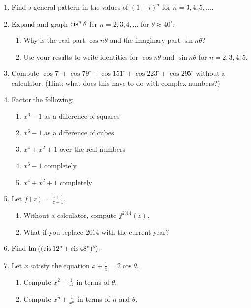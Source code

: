 \documentclass[../gatm.tex]{subfiles}
\begin{document}
\begin{enumerate}
\item Find a general pattern in the values of $(1+i)^n$ for $n=3,4,5,\ldots$.
\item Expand and graph $\operatorname{cis}^n \theta$ for $n=2,3,4,\ldots$ for $\theta\approx 40^\circ$.

\begin{enumerate}
\item Why is the real part $\cos n\theta$ and the imaginary part $\sin n\theta$?
\item Use your results to write identities for $\cos n\theta$ and $\sin n\theta$ for $n=2,3,4,5$.
\end{enumerate}

\newcommand{\cosdeg}[1] {\cos #1^\circ}

\item Compute $\cosdeg{7} + \cosdeg{79} + \cosdeg{151} + \cosdeg{223} + \cosdeg{295}$ without a calculator. (Hint: what does this have to do with complex numbers?)
\item Factor the following:
\begin{multicols}{2}
\begin{enumerate}
\item $x^6-1$ as a difference of squares
\item $x^6-1$ as a difference of cubes
\item $x^4+x^2+1$ over the real numbers
\item $x^6-1$ completely
\item $x^4+x^2+1$ completely
\end{enumerate}
\end{multicols}

\item Let $f(z)=\frac{z+1}{z-1}$.
\begin{enumerate}
\item Without a calculator, compute $f^{2014}(z)$.
\item What if you replace $2014$ with the current year?
\end{enumerate}

\item Find $\operatorname{Im}\left((\operatorname{cis} 12^\circ + \operatorname{cis} 48^\circ)^6\right)$.

\item Let $x$ satisfy the equation $x+\frac{1}{x}=2\cos\theta$.
\begin{enumerate}
\item Compute $x^2+\frac{1}{x^2}$ in terms of $\theta$.
\item Compute $x^n+\frac{1}{x^n}$ in terms of $n$ and $\theta$.
\end{enumerate}
\end{enumerate}
\end{document}
